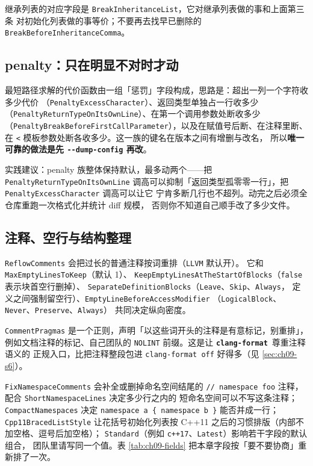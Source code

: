 \documentclass[12pt,a4paper,fontset=fandol]{ctexbook}
\newcommand{\cpp}[1]{C++#1}
\newcommand{\Opt}[1]{\texttt{-\/-#1}}
\newcommand{\Bk}{\discretionary{}{}{}}
\newcommand{\Lib}[1]{\textbf{\texttt{#1}}}
\newcommand{\Fmt}{\Lib{clang-format}}
\begin{document}
继承列表的对应字段是 \texttt{BreakInheritanceList}，它对继承列表做的事和上面第三条
对初始化列表做的事等价；不要再去找早已删除的 \texttt{BreakBeforeInheritanceComma}。

\subsection{penalty：只在明显不对时才动}\label{sec:ch09-s4-penalty}

最短路径求解的代价函数由一组「惩罚」字段构成，思路是：超出一列一个字符收多少代价
（\texttt{Penalty{\Bk}Excess{\Bk}Character}）、返回类型单独占一行收多少
（\texttt{Penalty{\Bk}Return{\Bk}Type{\Bk}On{\Bk}Its{\Bk}Own{\Bk}Line}）、在第一个调用参数处断收多少
（\texttt{Penalty{\Bk}Break{\Bk}Before{\Bk}First{\Bk}Call{\Bk}Parameter}），以及在赋值号后断、在注释里断、
在 \texttt{<} 模板参数处断各收多少。这一族的键名在版本之间有增删与改名，
所以\textbf{唯一可靠的做法是先 \Opt{dump-config} 再改}。

实践建议：penalty 族整体保持默认，最多动两个——把 \texttt{PenaltyReturnType\-OnItsOwnLine}
调高可以抑制「返回类型孤零零一行」，把 \texttt{PenaltyExcessCharacter} 调高可以让它
宁肯多断几行也不超列。动完之后必须全仓库重跑一次格式化并统计 diff 规模，
否则你不知道自己顺手改了多少文件。

\subsection{注释、空行与结构整理}\label{sec:ch09-s4-comment}

\texttt{Reflow{\Bk}Comments} 会把过长的普通注释按词重排（\texttt{LLVM} 默认开）。
它和 \texttt{Max{\Bk}Empty{\Bk}Lines{\Bk}To{\Bk}Keep}（默认 1）、
\texttt{Keep{\Bk}Empty{\Bk}Lines{\Bk}At{\Bk}The{\Bk}Start{\Bk}Of{\Bk}Blocks}（\texttt{false} 表示块首空行删掉）、
\texttt{Separate{\Bk}Definition{\Bk}Blocks}（\texttt{Leave}、\texttt{Skip}、\texttt{Always}，
定义之间强制留空行）、\texttt{Empty{\Bk}Line{\Bk}Before{\Bk}Access{\Bk}Modifier}
（\texttt{Logical{\Bk}Block}、\texttt{Never}、\texttt{Preserve}、\texttt{Always}）
共同决定纵向密度。

\texttt{CommentPragmas} 是一个正则，声明「以这些词开头的注释是有意标记，别重排」，
例如文档注释的标记、自己团队的 \texttt{NOLINT} 前缀。这是让 \Fmt\ 尊重注释语义的
正规入口，比把注释整段包进 \texttt{clang-format off} 好得多（见 \ref{sec:ch09-s6}）。

\texttt{Fix{\Bk}Namespace{\Bk}Comments} 会补全或删掉命名空间结尾的
\texttt{// namespace foo} 注释，配合 \texttt{Short{\Bk}Namespace{\Bk}Lines} 决定多少行之内的
短命名空间可以不写这条注释；\texttt{Compact{\Bk}Namespaces} 决定
\texttt{namespace a \{ namespace b \}} 能否并成一行；\texttt{Cpp11{\Bk}Braced{\Bk}List{\Bk}Style}
让花括号初始化列表按 \cpp{11} 之后的习惯排版（内部不加空格、逗号后加空格）；
\texttt{Standard}（例如 \texttt{c++17}、\texttt{Latest}）影响若干字段的默认组合，
团队里请写同一个值。表 \ref{tab:ch09-fields} 把本章字段按「要不要协商」重新排了一次。
\end{document}
